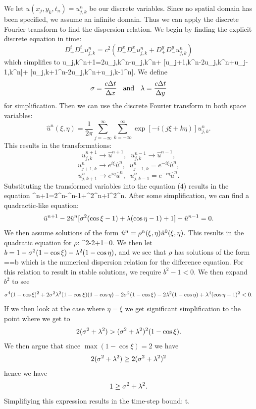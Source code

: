 			We let $u(x_j,y_k,t_n)=u_{j,k}^n$ be our discrete variables.
			Since no spatial domain has been specified, we assume an infinite domain. 
			Thus we can apply the discrete Fourier transform to find the dispersion relation.
			We begin by finding the explicit discrete equation in time:
			$$D_+^tD_-^t u_{j,k}^n=c^2(D_+^xD_-^xu_{j,k}^n+D_+^yD_-^yu_{j,k}^n)$$
			which simplifies to 
			\bq u_{j,k}^{n+1}=2u_{j,k}^n-u_{j,k}^n+
				[u_{j+1,k}^n-2u_{j,k}^n+u_{j-1,k}^n]+
				[u_{j,k+1}^n-2u_{j,k}^n+u_{j,k-1}^n].\eq
			We define
			$$\sigma=\frac{c\Delta t}{\Delta x}\;\;\text{ and }\;\; \lambda=\frac{c\Delta t}{\Delta y}$$
			for simplification. Then we can use the discrete Fourier transform in both space variables:
			$$\hat{u}^n(\xi,\eta)=\frac{1}{2\pi}\sum_{j=-\infty}^\infty\sum_{k=-\infty}^\infty 
				\exp[-i(j\xi+k\eta)]u_{j,k}^n.$$
			This results in the transformations:
			$$u_{j,k}^{n+1}\to \hat{u}^{n+1},\;\; u_{j,k}^{n-1}\to \hat{u}^{n-1},$$
			$$u_{j+1,k}^n\to e^{i\xi}\hat{u}^n,\;\; u_{j-1,k}^n=e^{-i\xi}\hat{u}^n,$$
			$$u_{j,k+1}^n\to e^{i\eta}\hat{u}^n,\;\; u_{j,k-1}^n=e^{-i\eta}\hat{u}^n.$$
			Substituting the transformed variables into the equation (4) results in the equation
			\bq \hat{u}^{n+1}=2^n-^{n-1}+\s^2^n\left[e^{i\xi}-2+
				e^{-i\xi}\right]+\l^2^n.\eq
			After some simplification, we can find a quadractic-like equation:
			$$\hat{u}^{n+1}-2\hat{u}^n[\sigma^2(\cos\xi-1)+\lambda(\cos\eta-1)+1]+\hat{u}^{n-1}=0.$$
			We then assume solutions of the form $\hat{u}^n=\rho^n(\xi,\eta)\hat{u}^0(\xi,\eta).$ 
			This results in the quadratic equation for $\rho$:
			\bq \rho^2-2+1=0.\eq
			We then let $b=1-\sigma^2(1-\cos\xi)-\lambda^2(1-\cos\eta)$, and we see that $\rho$ 
			has solutions of the form
			\bq \rho==b\pm{}\eq
			which is the numerical dispersion relation for the difference equation. 
			For this relation to result in stable solutions, we require $b^2-1<0.$ 
			We then expand $b^2$ to see
			$$\sigma^4(1-\cos\xi)^2+2\sigma^2\lambda^2(1-\cos\xi)(1-\cos\eta)
				-2\sigma^2(1-\cos\xi)-2\lambda^2(1-\cos\eta)+\lambda^4(\cos\eta-1)^2<0.$$
			If we then look at the case where $\eta=\xi$ we get significant simplification to the point where we get to
			$$2(\sigma^2+\lambda^2)>(\sigma^2+\lambda^2)^2(1-\cos\xi).$$
			We then argue that since $\max(1-\cos\xi)=2$ we have
			$$2(\sigma^2+\lambda^2)\geq2(\sigma^2+\lambda^2)^2$$
			hence we have
			$$1\geq \sigma^2+\lambda^2.$$
			Simplifiying this expression results in the time-step bound:
			\bq \Delta t\leq \frac{\Delta x\Delta y}{|c|\sqrt{\Delta x^2+\Delta y^2}}.\eq
			
